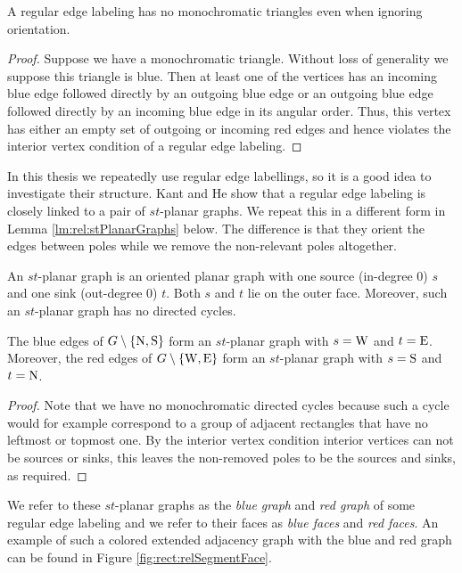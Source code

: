   \begin{lemma}
    \label{lm:rel:noMonoColoredTriangles}
    A regular edge labeling has no monochromatic triangles even when ignoring orientation.
  \end{lemma}

  \begin{proof}
    Suppose we have a monochromatic triangle. Without loss of generality we suppose this triangle is blue. Then at least one of the vertices has an incoming blue edge followed directly by an outgoing blue edge or an outgoing blue edge followed directly by an incoming blue edge in its angular order. Thus, this vertex has either an empty set of outgoing or incoming red edges and hence violates the interior vertex condition of a regular edge labeling.
  \end{proof}

    In this thesis we repeatedly use regular edge labellings, so it is a good idea to investigate their structure.
    Kant and He \cite{Kant1997} show that a regular edge labeling is closely linked to a pair of $st$-planar graphs. We repeat this in a different form in Lemma \ref{lm:rel:stPlanarGraphs} below. The difference is that they orient the edges between poles while we remove the non-relevant poles altogether. 

    An $st$-planar graph is an oriented planar graph with one source (in-degree 0) $s$ and one sink (out-degree 0) $t$. Both $s$ and $t$ lie on the outer face. Moreover, such an $st$-planar graph has no directed cycles.

    \begin{lemma}
      \label{lm:rel:stPlanarGraphs}
      The blue edges of $G\setminus \left\lbrace {\mathrm{N},\mathrm{S}} \right\rbrace$ form an $st$-planar graph with $s= \mathrm{W}$ and $t=\mathrm{E}$. Moreover, the red edges of $G\setminus \left\lbrace {\mathrm{W},\mathrm{E}} \right\rbrace$ form an $st$-planar graph with $s= \mathrm{S}$ and $t= \mathrm{N}$.
    \end{lemma}
    \begin{proof}
      Note that we have no monochromatic directed cycles because such a cycle would for example correspond to a  group of adjacent rectangles that have  no leftmost or topmost one. By the interior vertex condition interior vertices can not be sources or sinks, this leaves the non-removed poles to be the sources and sinks, as required.
    \end{proof}

    We refer to these $st$-planar graphs as the \emph{blue graph} and \emph{red graph} of some regular edge labeling and we refer to their faces as \emph{blue faces} and \emph{red faces}. An example of such a colored extended adjacency graph with the blue and red graph can be found in Figure \ref{fig:rect:relSegmentFace}.

